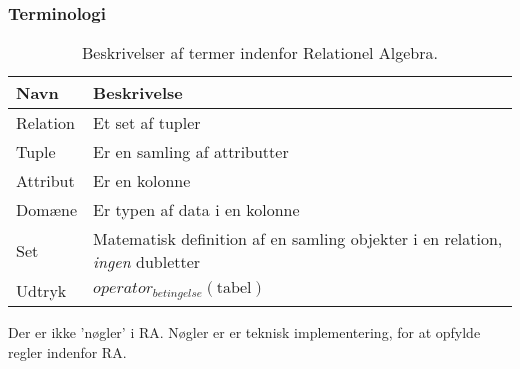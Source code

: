 \subsubsection{Terminologi}

\begin{table}[H]
	\begin{tabu}{lX}
		\toprule
		\textbf{Navn} & \textbf{Beskrivelse}\\
		\midrule
		Relation & Et set af tupler\\
		Tuple & Er en samling af attributter\\
		Attribut & Er en kolonne\\
		Domæne & Er typen af data i en kolonne\\
		Set & Matematisk definition af en samling objekter i en relation, \textit{ingen} dubletter\\
		Udtryk & $operator_{betingelse}(\text{tabel})$\\
		\bottomrule
	\end{tabu}
	\caption{Beskrivelser af termer indenfor Relationel Algebra.}
\end{table}

Der er ikke 'nøgler' i RA. Nøgler er er teknisk implementering, for at opfylde regler indenfor RA.

%

%
